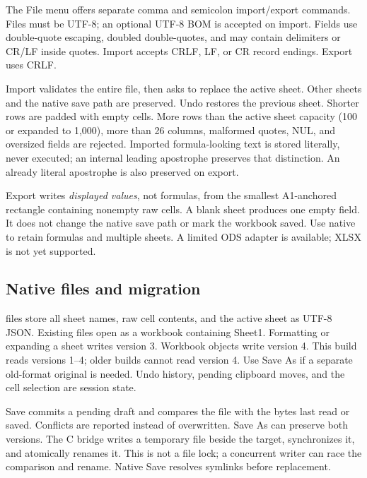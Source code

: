 \documentclass[11pt,letterpaper]{article}
\newcommand{\code}[1]{\texttt{\detokenize{#1}}}
\begin{document}
The File menu offers separate comma and semicolon import/export commands. Files
must be UTF-8; an optional UTF-8 BOM is accepted on import. Fields use double-quote
escaping, doubled double-quotes, and may contain delimiters or CR/LF inside quotes.
Import accepts CRLF, LF, or CR record endings. Export uses CRLF.

Import validates the entire file, then asks to replace the active sheet. Other
sheets and the native save path are preserved. Undo restores the previous sheet.
Shorter rows are padded with empty cells. More rows than the active sheet capacity (100 or expanded to 1,000), more than 26 columns,
malformed quotes, NUL, and oversized fields are rejected. Imported formula-looking
text is stored literally, never executed; an internal leading apostrophe preserves
that distinction. An already literal apostrophe is also preserved on export.

Export writes \emph{displayed values}, not formulas, from the smallest A1-anchored
rectangle containing nonempty raw cells. A blank sheet produces one empty field.
It does not change the native save path or mark the workbook saved. Use native
\code{.lcalc} to retain formulas and multiple sheets. A limited ODS adapter is available; XLSX is not yet supported.

\subsection{Native files and migration}
\code{LeanCalc-2} files store all sheet names, raw cell contents, and the active
sheet as UTF-8 JSON. Existing \code{LeanCalc-1} files open as a workbook containing
Sheet1. Formatting or expanding a sheet writes version 3. Workbook objects write version 4.
This build reads versions 1--4; older builds cannot read version 4.
Use Save As if a separate old-format original is needed. Undo history, pending
clipboard moves, and the cell selection are session state.

Save commits a pending draft and compares the file with the bytes last read or
saved. Conflicts are reported instead of overwritten. Save As can preserve both
versions. The C bridge writes a temporary file beside the target, synchronizes it,
and atomically renames it. This is not a file lock; a concurrent writer can race
the comparison and rename. Native Save resolves symlinks before replacement.

\clearpage
\end{document}
